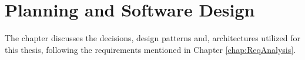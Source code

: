 \newpage
\chapter{Planning and Software Design}
\label{chap:design}
The chapter discusses the decisions, design patterns and, architectures utilized for this thesis, following the requirements mentioned in 
Chapter \ref{chap:ReqAnalysis}.

%





%



